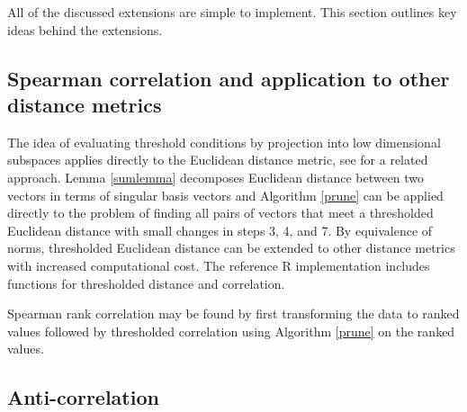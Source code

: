\documentclass{article}
\let\proglang=\textsf
\numberwithin{algorithmctr}{section}
\begin{document}
All of the discussed extensions are simple to implement. This section
outlines key ideas behind the extensions.

\subsection{Spearman correlation and application to other distance metrics}

The idea of evaluating threshold conditions by projection into low dimensional
subspaces applies directly to the Euclidean distance metric, see
\cite{svd-similarity} for a related approach. Lemma \ref{sumlemma} decomposes
Euclidean distance between two vectors in terms of singular basis vectors and
Algorithm \ref{prune} can be applied directly to the problem of finding all
pairs of vectors that meet a thresholded Euclidean distance with small changes
in steps 3, 4, and 7.  By equivalence of norms, thresholded Euclidean distance
can be extended to other distance metrics with increased computational cost.
The reference \proglang{R} implementation \cite{sup} includes functions for
thresholded distance and correlation.

Spearman rank correlation may be found by first transforming the data to ranked
values followed by thresholded correlation using Algorithm \ref{prune} on the
ranked values.


\subsection{Anti-correlation}
\end{document}
